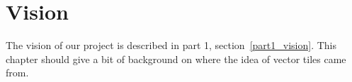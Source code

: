 \chapter{Vision}\label{vision}

The vision of our project is described in part 1, section~\ref{part1_vision}. This chapter should give a bit of background on where the idea of vector tiles came from.

